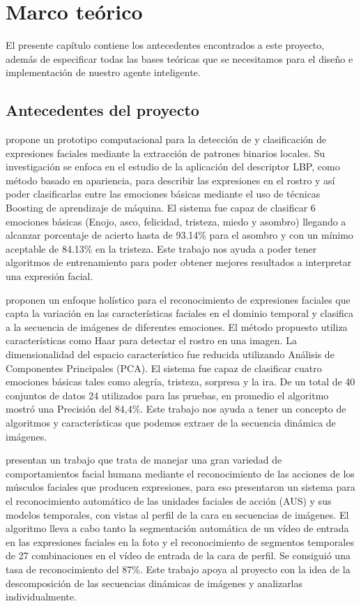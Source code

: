 \chapter{Marco teórico}

El presente capítulo contiene los antecedentes encontrados a este proyecto, además de especificar todas las bases teóricas que se necesitamos para el diseño e implementación de nuestro agente inteligente.

\section{Antecedentes del proyecto}

\cite{Cama} propone un prototipo computacional para la detección de y clasificación de expresiones faciales mediante la extracción de patrones binarios locales. Su investigación se enfoca en el estudio de la aplicación del descriptor LBP, como método basado en apariencia, para describir las expresiones en el rostro y así poder clasificarlas entre las emociones básicas mediante el uso de técnicas Boosting de aprendizaje de máquina. El sistema fue capaz de clasificar 6 emociones básicas (Enojo, asco, felicidad, tristeza, miedo y asombro) llegando a alcanzar porcentaje de acierto hasta de 93.14\% para el asombro y con un mínimo aceptable de 84.13\% en la tristeza. Este trabajo nos ayuda a poder tener algoritmos de entrenamiento para poder obtener mejores resultados a interpretar una expresión facial.
\vskip 0.1cm

\cite{Bajaj} proponen un enfoque holístico para el reconocimiento de expresiones faciales que capta la variación en las características faciales en el dominio temporal y clasifica a la secuencia de imágenes de diferentes emociones. El método propuesto utiliza características como Haar para detectar el rostro en una imagen. La dimensionalidad del espacio característico fue reducida utilizando Análisis de Componentes Principales (PCA). El sistema fue capaz de clasificar cuatro emociones básicas tales como alegría, tristeza, sorpresa y la ira. De un total de 40 conjuntos de datos 24 utilizados para las pruebas, en promedio el algoritmo mostró una Precisión del 84,4\%. Este trabajo nos ayuda a tener un concepto de algoritmos y características que podemos extraer de la secuencia dinámica de imágenes. 
\vskip 0.1cm

\cite{Patras} presentan un trabajo que trata de manejar una gran variedad de comportamientos facial humana mediante el reconocimiento de las acciones de los músculos faciales que producen expresiones, para eso presentaron un sistema para el reconocimiento automático de las unidades faciales de acción (AUS) y sus modelos temporales, con vistas al perfil de la cara en secuencias de imágenes. El algoritmo lleva a cabo tanto la segmentación automática de un vídeo de entrada en las expresiones faciales en la foto y el reconocimiento de segmentos temporales de 27 combinaciones en el vídeo de entrada de la cara de perfil. Se consiguió una tasa de reconocimiento del 87\%. Este trabajo apoya al proyecto con la idea de la descomposición de las secuencias dinámicas de imágenes y analizarlas individualmente. 

